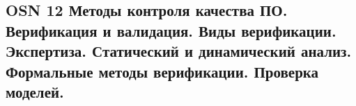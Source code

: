 \subsection{OSN 12 Методы контроля качества ПО. Верификация и валидация. Виды верификации. Экспертиза. Статический и динамический анализ. Формальные методы верификации. Проверка моделей.}
